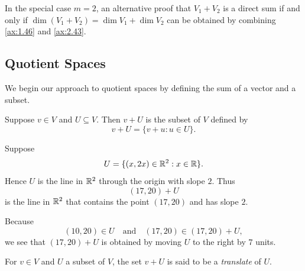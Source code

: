 In the special case $m=2$, an alternative proof that $V_1+V_2$ is a direct sum
if and only if $\dim(V_1+V_2)=\dim V_1+\dim V_2$ can be obtained by combining
\ref{ax:1.46} and \ref{ax:2.43}.

\subsection{Quotient Spaces}

We begin our approach to quotient spaces by defining the sum of a vector and a
subset.

\begin{notation}[$v+U$]\label{ax:3.95}
Suppose $v\in V$ and $U\subseteq V$. Then $v+U$ is the subset of $V$ defined by
\[ v+U = \{v+u : u\in U\}. \]
\end{notation}

%
\begin{example}\label{ax:3.96}
Suppose
\[ U = \{(x,2x)\in\mathbb{R}^2 : x\in\mathbb{R}\}. \]
Hence $U$ is the line in $\mathbb{R}^2$ through the origin with slope $2$. Thus
\[ (17,20)+U \]
is the line in $\mathbb{R}^2$ that contains the point $(17,20)$ and has slope $2$.

Because
\[ (10,20)\in U \quad\text{and}\quad (17,20)\in(17,20)+U, \]
we see that $(17,20)+U$ is obtained by moving $U$ to the right by $7$ units.
\end{example}

\begin{definition}[Translate]\label{ax:3.97}
For $v\in V$ and $U$ a subset of $V$, the set $v+U$ is said to be a
\emph{translate} of $U$.
\end{definition}

